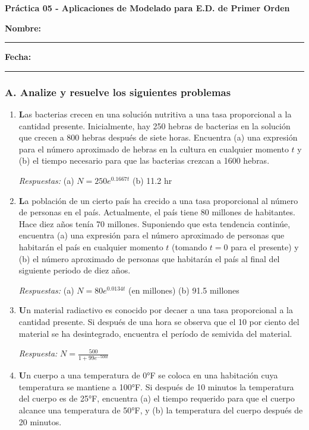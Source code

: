 \documentclass[a4paper,12pt]{article}
\begin{document}
\begin{center}
    \Large\textbf{Práctica 05 - Aplicaciones de Modelado para E.D. de Primer Orden}\\[1cm]  

\end{center}
  \textbf{Nombre:} \rule{9cm}{0.4pt}  \textbf{Fecha:} \rule{4.5cm}{0.4pt}



\subsubsection*{A. Analize y resuelve los siguientes problemas}

\begin{enumerate}
    \item \textbf Las bacterias crecen en una solución nutritiva a una tasa proporcional a la cantidad presente. Inicialmente, hay 250 hebras de bacterias en la solución que crecen a 800 hebras después de siete horas. Encuentra (a) una expresión para el número aproximado de hebras en la cultura en cualquier momento \(t\) y (b) el tiempo necesario para que las bacterias crezcan a 1600 hebras.

\textit{Respuestas:}  
(a) \(N = 250e^{0.1667t}\)  
(b) 11.2 hr
    \item \textbf La población de un cierto país ha crecido a una tasa proporcional al número de personas en el país. Actualmente, el país tiene 80 millones de habitantes. Hace diez años tenía 70 millones. Suponiendo que esta tendencia continúe, encuentra (a) una expresión para el número aproximado de personas que habitarán el país en cualquier momento \(t\) (tomando \(t = 0\) para el presente) y (b) el número aproximado de personas que habitarán el país al final del siguiente periodo de diez años.

\textit{Respuestas:}  
(a) \(N = 80e^{0.0134t}\) (en millones)  
(b) 91.5 millones
    \item \textbf Un material radiactivo es conocido por decaer a una tasa proporcional a la cantidad presente. Si después de una hora se observa que el 10 por ciento del material se ha desintegrado, encuentra el período de semivida del material.

\textit{Respuesta:}  
\(N = \frac{500}{1 + 99e^{-500t}}\)
    \item \textbf Un cuerpo a una temperatura de 0°F se coloca en una habitación cuya temperatura se mantiene a 100°F. Si después de 10 minutos la temperatura del cuerpo es de 25°F, encuentra (a) el tiempo requerido para que el cuerpo alcance una temperatura de 50°F, y (b) la temperatura del cuerpo después de 20 minutos.


\end{enumerate}
\end{document}
